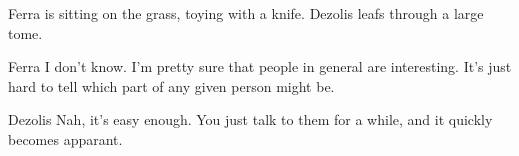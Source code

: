 


Ferra is sitting on the grass, toying with a knife.
Dezolis leafs through a large tome.

\begin{dialogue}{Ferra}
I don't know.
I'm pretty sure that people in general are interesting.
It's just hard to tell which part of any given person might be.
\end{dialogue}

\begin{dialogue}{Dezolis}
Nah, it's easy enough.
You just talk to them for a while, and it quickly becomes apparant.
\end{dialogue}

